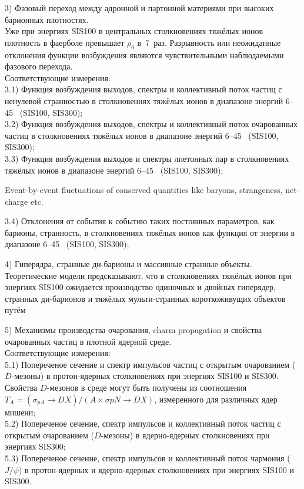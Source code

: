 3) Фазовый переход между адронной и партонной материями при высоких барионных плотностях. \\
Уже при энергиях SIS100 в центральных столкновениях тяжёлых ионов плотность в фаерболе превышает $\rho_{0}$ в~7~раз. Разрывность или неожиданные отклонения функции возбуждения являются чувствительными наблюдаемыми фазового перехода. \\
Соответствующие измерения: \\
3.1) Функция возбуждения выходов, спектры и коллективный поток частиц с ненулевой странностью в столкновениях тяжёлых ионов в диапазоне энергий 6--45~\GeVperNucl{} (SIS100, SIS300); \\
3.2) Функция возбуждения выходов, спектры и коллективный поток очарованных частиц в столкновениях тяжёлых ионов в диапазоне энергий 6--45~\GeVperNucl{} (SIS100, SIS300); \\
3.3) Функция возбуждения выходов и спектры лпетонных пар в столкновениях тяжёлых ионов в диапазоне энергий 6--45~\GeVperNucl{} (SIS100, SIS300);

\todo Event-by-event fluctuations of conserved quantities like baryons, strangeness, net-charge etc.

3.4) Отклонения от события к событию таких постоянных параметров, как барионы, странность, \todo
в столкновениях тяжёлых ионов как функция от энергии в диапазоне 6--45~\GeVperNucl{} (SIS100, SIS300);

4) Гиперядра, странные ди-барионы и массивные странные объекты. \\
Теоретические модели предсказывают, что в столкновениях тяжёлых ионов при энергиях SIS100 ожидается производство одиночных \todo и двойных \todo гиперядер, странных ди-барионов и тяжёлых мульти-странных короткоживущих объектов путём

5) Механизмы производства очарования, charm propagation и свойства очарованных частиц в плотной ядерной среде. \\
Соответствующие измерения: \\
5.1) Попереченое сечение и спектр импульсов частиц с открытым очарованием ($D$-мезоны) в протон-ядерных столкновениях при энергиях SIS100 и SIS300. Свойства $D$-мезонов в среде могут быть получены из соотношения $T_{A} = (\sigma_{pA} \rightarrow DX) / (A \times \sigma{pN} \rightarrow DX)$, измеренного для различных ядер мишени; \\
5.2) Попереченое сечение, спектр импульсов и коллективный поток частиц с открытым очарованием ($D$-мезоны) в ядерно-ядерных столкновениях при энергиях SIS300; \\
5.3) Попереченое сечение, спектр импульсов и коллективный поток чармония ($J/\psi$) в протон-ядерных и ядерно-ядерных столкновениях при энергиях SIS100 и SIS300.


